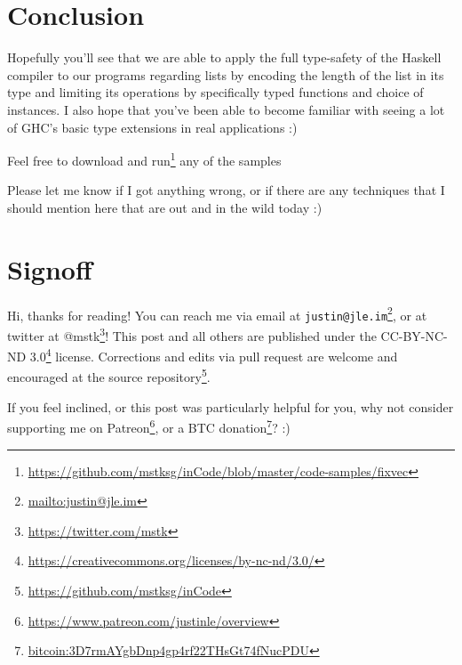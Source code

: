 \documentclass[]{article}
\renewcommand{\href}[2]{#2\footnote{\url{#1}}}
\begin{document}
\section{Conclusion}\label{conclusion}

Hopefully you'll see that we are able to apply the full type-safety of the
Haskell compiler to our programs regarding lists by encoding the length of the
list in its type and limiting its operations by specifically typed functions and
choice of instances. I also hope that you've been able to become familiar with
seeing a lot of GHC's basic type extensions in real applications :)

Feel free to
\href{https://github.com/mstksg/inCode/blob/master/code-samples/fixvec}{download
and run} any of the samples

Please let me know if I got anything wrong, or if there are any techniques that
I should mention here that are out and in the wild today :)

\section{Signoff}\label{signoff}

Hi, thanks for reading! You can reach me via email at
\href{mailto:justin@jle.im}{\nolinkurl{justin@jle.im}}, or at twitter at
\href{https://twitter.com/mstk}{@mstk}! This post and all others are published
under the \href{https://creativecommons.org/licenses/by-nc-nd/3.0/}{CC-BY-NC-ND
3.0} license. Corrections and edits via pull request are welcome and encouraged
at \href{https://github.com/mstksg/inCode}{the source repository}.

If you feel inclined, or this post was particularly helpful for you, why not
consider \href{https://www.patreon.com/justinle/overview}{supporting me on
Patreon}, or a \href{bitcoin:3D7rmAYgbDnp4gp4rf22THsGt74fNucPDU}{BTC donation}?
:)
\end{document}
